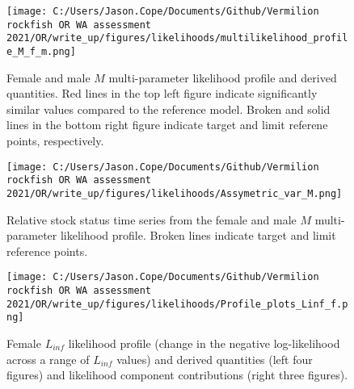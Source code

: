 \documentclass[11pt,
  english,
  a4paper,
]{article}
\begin{document}
\tagmcend\tagstructend


\begin{figure}
\centering
\texttt{[image: C:/Users/Jason.Cope/Documents/Github/Vermilion rockfish OR WA assessment 2021/OR/write\_up/figures/likelihoods/multilikelihood\_profile\_M\_f\_m.png]}
\caption{Female and male {\(M\)\leavevmode\tagmcend\tagstructend} multi-parameter likelihood profile and derived quantities. Red lines in the top left figure indicate significantly similar values compared to the reference model. Broken and solid lines in the bottom right figure indicate target and limit referene points, respectively.\label{fig:M-multiprofile-combo}}
\end{figure}

\tagmcend\tagstructend


\begin{figure}
\centering
\texttt{[image: C:/Users/Jason.Cope/Documents/Github/Vermilion rockfish OR WA assessment 2021/OR/write\_up/figures/likelihoods/Assymetric\_var\_M.png]}
\caption{Relative stock status time series from the female and male {\(M\)\leavevmode\tagmcend\tagstructend} multi-parameter likelihood profile. Broken lines indicate target and limit reference points.\label{fig:M-multiprofile-Bratio}}
\end{figure}

\tagmcend\tagstructend


\begin{figure}
\centering
\texttt{[image: C:/Users/Jason.Cope/Documents/Github/Vermilion rockfish OR WA assessment 2021/OR/write\_up/figures/likelihoods/Profile\_plots\_Linf\_f.png]}
\caption{Female {\(L_{inf}\)\leavevmode\tagmcend\tagstructend} likelihood profile (change in the negative log-likelihood across a range of {\(L_{inf}\)\leavevmode\tagmcend\tagstructend} values) and derived quantities (left four figures) and likelihood component contributions (right three figures).\label{fig:Linf_F-profile-combo}}
\end{figure}
\end{document}
